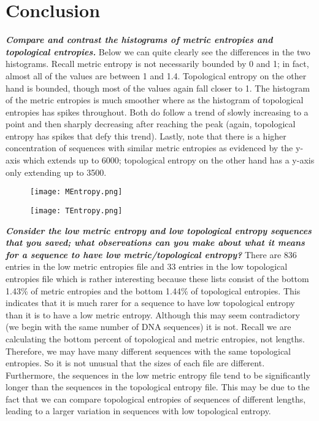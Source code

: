 \documentclass{article}
\begin{document}
\section{Conclusion}
\textbf{\textit{Compare and contrast the histograms of metric entropies and topological entropies.}}
\newline
\newline
Below we can quite clearly see the differences in the two histograms.
Recall metric entropy is not necessarily bounded by 0 and 1; in fact, almost all of the values are between 1 and 1.4.
Topological entropy on the other hand is bounded, though most of the values again fall closer to 1.
The histogram of the metric entropies is much smoother where as the histogram of topological entropies has spikes throughout.
Both do follow a trend of slowly increasing to a point and then sharply decreasing after reaching the peak (again, topological entropy has spikes that defy this trend).
Lastly, note that there is a higher concentration of sequences with similar metric entropies as evidenced by the y-axis which extends up to 6000; topological entropy on the other hand has a y-axis only extending up to 3500.
\begin{figure}[H]
    \centering
    \begin{minipage}{.5\textwidth}
      \centering
      \texttt{[image: MEntropy.png]}
      \label{fig:MetricEntropy}
    \end{minipage}%
    \begin{minipage}{.5\textwidth}
      \centering
      \texttt{[image: TEntropy.png]}
      \label{fig:TopologicalEntropy}
    \end{minipage}
    \end{figure}

\noindent\textbf{\textit{Consider the low metric entropy and low topological entropy sequences that you saved; what observations can you make about what it means for a sequence to have low metric/topological entropy?}}
\newline
\newline
There are 836 entries in the low metric entropies file and 33 entries in the low topological entropies file which is rather interesting because these lists consist of the bottom 1.43\% of metric entropies and the bottom 1.44\% of topological entropies.
This indicates that it is much rarer for a sequence to have low topological entropy than it is to have a low metric entropy.
Although this may seem contradictory (we begin with the same number of DNA sequences) it is not.
Recall we are calculating the bottom percent of topological and metric entropies, not lengths.
Therefore, we may have many different sequences with the same topological entropies.
So it is not unusual that the sizes of each file are different.
Furthermore, the sequences in the low metric entropy file tend to be significantly longer than the sequences in the topological entropy file.
This may be due to the fact that we can compare topological entropies of sequences of different lengths, leading to a larger variation in sequences with low topological entropy.
\end{document}
